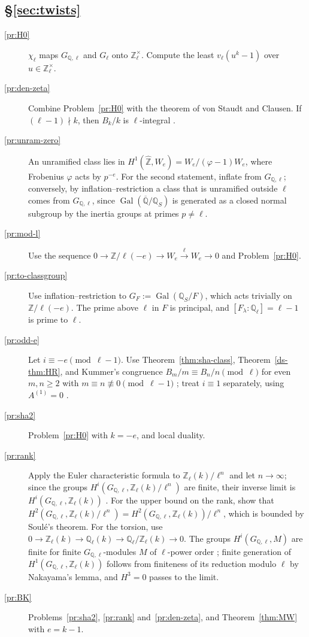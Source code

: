 \documentclass[reqno]{amsart}
\theoremstyle{definition}
\theoremstyle{plain}
\theoremstyle{remark}
\newcommand{\Z}{\mathbb{Z}}
\newcommand{\Q}{\mathbb{Q}}
\newcommand{\Zl}{\Z_\ell}
\newcommand{\Ql}{\Q_\ell}
\newcommand{\Gal}{\operatorname{Gal}}
\begin{document}
\subsection*{\S\ref{sec:twists}}
\begin{description}
\item[\ref{pr:H0}] \(\chi_\ell\) maps \(G_{\Q,\ell}\) and \(G_\ell\) onto \(\Zl^\times\).  Compute the least \(v_\ell(u^k - 1)\) over \(u \in \Zl^\times\).
\item[\ref{pr:den-zeta}] Combine Problem~\ref{pr:H0} with the theorem of von Staudt and Clausen.  If \((\ell - 1) \nmid k\), then \(B_k/k\) is \(\ell\)-integral \cite[Cor.~5.14]{Wa}.
\item[\ref{pr:unram-zero}] An unramified class lies in \(H^1(\hat{\Z}, W_e) = W_e/(\varphi - 1)W_e\), where Frobenius \(\varphi\) acts by \(p^{-e}\).  For the second statement, inflate from \(G_{\Q,\ell}\); conversely, by inflation--restriction a class that is unramified outside \(\ell\) comes from \(G_{\Q,\ell}\), since \(\Gal(\overline{\Q}/\Q_S)\) is generated as a closed normal subgroup by the inertia groups at primes \(p \ne \ell\).
\item[\ref{pr:mod-l}] Use the sequence \(0 \to \Z/\ell(-e) \to W_e \xrightarrow{\ell} W_e \to 0\) and Problem~\ref{pr:H0}.
\item[\ref{pr:to-classgroup}] Use inflation--restriction to \(G_F := \Gal(\Q_S/F)\), which acts trivially on \(\Z/\ell(-e)\).  The prime above \(\ell\) in \(F\) is principal, and \([F_\lambda : \Q_\ell] = \ell - 1\) is prime to \(\ell\).
\item[\ref{pr:odd-e}] Let \(i \equiv -e \pmod{\ell - 1}\).  Use Theorem~\ref{thm:sha-class}, Theorem~\ref{ds-thm:HR}, and Kummer's congruence \(B_m/m \equiv B_n/n \pmod \ell\) for even \(m, n \ge 2\) with \(m \equiv n \not\equiv 0 \pmod{\ell-1}\) \cite[Ch.~5]{Wa}; treat \(i \equiv 1\) separately, using \(A^{(1)} = 0\) \cite[Prop.~6.16]{Wa}.
\item[\ref{pr:sha2}] Problem~\ref{pr:H0} with \(k = -e\), and local duality.
\item[\ref{pr:rank}] Apply the Euler characteristic formula to \(\Zl(k)/\ell^n\) and let \(n \to \infty\); since the groups \(H^i(G_{\Q,\ell}, \Zl(k)/\ell^n)\) are finite, their inverse limit is \(H^i(G_{\Q,\ell}, \Zl(k))\) \cite[Ch.~II, \S7]{NSW}.  For the upper bound on the rank, show that \(H^2(G_{\Q,\ell}, \Zl(k)/\ell^n) = H^2(G_{\Q,\ell}, \Zl(k))/\ell^n\), which is bounded by Soulé's theorem.  For the torsion, use \(0 \to \Zl(k) \to \Ql(k) \to \Ql/\Zl(k) \to 0\).  The groups \(H^i(G_{\Q,\ell}, M)\) are finite for finite \(G_{\Q,\ell}\)-modules \(M\) of \(\ell\)-power order \cite[Ch.~VIII, \S3]{NSW}; finite generation of \(H^1(G_{\Q,\ell}, \Zl(k))\) follows from finiteness of its reduction modulo \(\ell\) by Nakayama's lemma, and \(H^3 = 0\) passes to the limit.
\item[\ref{pr:BK}] Problems~\ref{pr:sha2}, \ref{pr:rank} and~\ref{pr:den-zeta}, and Theorem~\ref{thm:MW} with \(e = k - 1\).
\end{description}
\end{document}

